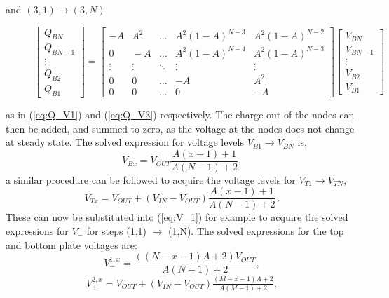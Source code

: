 \documentclass[conference]{IEEEtran}
\begin{document}
	and $(3,1)\rightarrow(3,N)$ 
	\begin{figure}
	\begin{equation}
	\begin{bmatrix}
	Q_{BN} \\
	Q_{BN-1} \\
	\vdots\\
	Q_{B2} \\ 
	Q_{B1}
	\end{bmatrix}
	=
	\begin{bmatrix}
	-A \!& A^2 & \dots & A^2(1\!-\!A)^{N-3} & A^2(1\!-\!A)^{N-2} \\
	0 \!& \!-A & \dots & A^2(1\!-\!A)^{N-4} & A^2(1\!-\!A)^{N-3}\\
	\vdots & \vdots & \ddots & \vdots & \vdots \\
	0 \!& 0 \!& \dots & -A & A^2\\ 
	0 \!& 0 \!& \dots & 0 & -A 
	\end{bmatrix}\!\begin{bmatrix}
	V_{BN} \\
	V_{BN-1} \\
	\vdots \\
	V_{B2} \\
	V_{B1}
	\end{bmatrix}
	\label{eq:Q_V3}
	\end{equation}
\end{figure}
	as in (\ref{eq:Q_V1}) and (\ref{eq:Q_V3}) respectively.
	The charge out of the nodes can then be added, and summed to zero, as the voltage at the nodes does not change at steady state. The solved expression for voltage levels $V_{B1} \rightarrow V_{BN}$ is,
	\begin{equation}
	V_{Bx} = V_{OUT}\frac{A(x-1) + 1}{A(N-1) + 2},
	\end{equation}
	a similar procedure can be followed to acquire the voltage levels for $V_{T1} \rightarrow V_{TN}$,
	\begin{equation}
	V_{Tx} = V_{OUT} + (V_{IN} - V_{OUT})\frac{A(x-1) + 1}{A(N-1) + 2}\,.
	\end{equation}
	These can now be substituted into (\ref{eq:V_1}) for example to acquire the solved expressions for $V_-$ for steps (1,1) $\rightarrow$ (1,N).
	The solved expressions for the top and bottom plate voltages are:
	\begin{equation}
	V_{-}^{1,x} = \frac{((N-x-1)A + 2)V_{OUT}}{A(N-1) + 2},
	\end{equation}
	\begin{equation}
	V_{+}^{2,x} = V_{OUT} + (V_{IN} -V_{OUT})\tfrac{(M-x-1)A + 2}{A(M-1) + 2},
	\end{equation}
\end{document}
